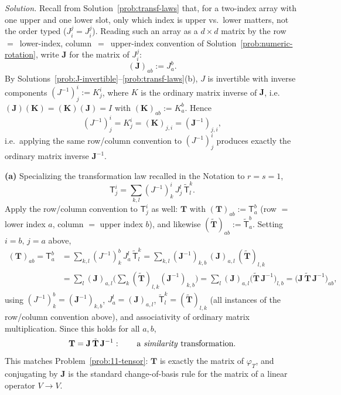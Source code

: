 \documentclass[11pt]{article}
\begin{document}
\medskip
\noindent\textit{Solution.} Recall from Solution~\ref{prob:transf-laws} that, for a two-index array with one upper and one lower slot, only which index is upper vs.\ lower matters, not the order typed ($J_i^j=J^j_i$). Reading such an array as a $d\times d$ matrix by the row~$=$~lower-index, column~$=$~upper-index convention of Solution~\ref{prob:numeric-rotation}, write $\mathbf J$ for the matrix of $J_i^j$:
\[
(\mathbf J)_{ab}:=J_a^b.
\]
By Solutions~\ref{prob:J-invertible}--\ref{prob:transf-laws}(b), $J$ is invertible with inverse components $(J^{-1})^i_j:=K_j^i$, where $K$ is the ordinary matrix inverse of $\mathbf J$, i.e.\ $(\mathbf J)(\mathbf K)=(\mathbf K)(\mathbf J)=I$ with $(\mathbf K)_{ab}:=K_a^b$. Hence
\[
(J^{-1})^i_j=K_j^i=(\mathbf K)_{j,i}=(\mathbf J^{-1})_{j,i},
\]
i.e.\ applying the same row/column convention to $(J^{-1})^i_j$ produces exactly the ordinary matrix inverse $\mathbf J^{-1}$.

\textbf{(a)} Specializing the transformation law recalled in the Notation to $r=s=1$,
\[
\mathsf T^i_j=\sum_{k,l}(J^{-1})^i_k\,J^l_j\,\tilde{\mathsf T}^k_l.
\]
Apply the row/column convention to $\mathsf T^i_j$ as well: $\mathbf T$ with $(\mathbf T)_{ab}:=\mathsf T^b_a$ (row $=$ lower index $a$, column $=$ upper index $b$), and likewise $(\tilde{\mathbf T})_{ab}:=\tilde{\mathsf T}^b_a$. Setting $i=b,\,j=a$ above,
\begin{align*}
(\mathbf T)_{ab}=\mathsf T^b_a &=\sum_{k,l}(J^{-1})^b_k\,J^l_a\,\tilde{\mathsf T}^k_l =\sum_{k,l}(\mathbf J^{-1})_{k,b}\,(\mathbf J)_{a,l}\,(\tilde{\mathbf T})_{l,k} \\
&=\sum_l(\mathbf J)_{a,l}\Big(\sum_k(\tilde{\mathbf T})_{l,k}(\mathbf J^{-1})_{k,b}\Big) =\sum_l(\mathbf J)_{a,l}\big(\tilde{\mathbf T}\,\mathbf J^{-1}\big)_{l,b} =\big(\mathbf J\,\tilde{\mathbf T}\,\mathbf J^{-1}\big)_{ab},
\end{align*}
using $(J^{-1})^b_k=(\mathbf J^{-1})_{k,b}$, $J^l_a=(\mathbf J)_{a,l}$, $\tilde{\mathsf T}^k_l=(\tilde{\mathbf T})_{l,k}$ (all instances of the row/column convention above), and associativity of ordinary matrix multiplication. Since this holds for all $a,b$,
\[
\mathbf T=\mathbf J\,\tilde{\mathbf T}\,\mathbf J^{-1}: \qquad \text{a \emph{similarity} transformation.}
\]
This matches Problem~\ref{prob:11-tensor}: $\mathbf T$ is exactly the matrix of $\varphi_T$, and conjugating by $\mathbf J$ is the standard change-of-basis rule for the matrix of a linear operator $V\to V$.
\end{document}
